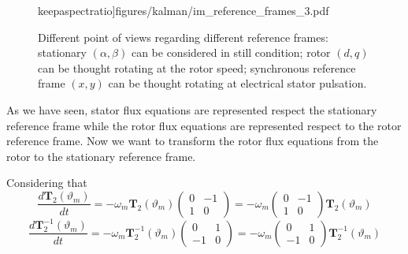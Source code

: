 \documentclass[11pt,a4paper]{scrartcl}
\numberwithin{equation}{section}
\theoremstyle{it}
\theoremstyle{definition}
\begin{document}
\begin{onehalfspace}
\begin{figure}[H]
	keepaspectratio]{figures/kalman/im_reference_frames_3.pdf}
	\captionsetup{width=.5\textwidth}
	\caption{Different point of views regarding different reference frames: 
		stationary $(\alpha,\beta)$ can be considered in still condition; rotor 
		$(d,q)$ can be thought rotating at the rotor speed; synchronous 
		reference 
		frame $(x,y)$ can be thought rotating at electrical stator pulsation.}
	\label{figure_im_ref_frame2} 
\end{figure}

As we have seen, stator flux equations are represented respect the stationary 
reference frame while the rotor flux equations are represented respect to the 
rotor reference frame. Now we want to transform the rotor flux equations from 
the rotor to the stationary reference frame. 

Considering that
\begin{equation}\label{im_eq_15}
	\frac{d\mathbf{T}_2(\vartheta_m)}{dt}= 
	-\omega_m\mathbf{T}_2(\vartheta_m)\begin{pmatrix} 0 & -1\\ 1 & 0 
	\end{pmatrix} = -\omega_m\begin{pmatrix} 0 & -1\\ 1 & 0 \end{pmatrix} 
	\mathbf{T}_2(\vartheta_m)
\end{equation}
\begin{equation}\label{im_eq_16}
	\frac{d\mathbf{T}_2^{-1}(\vartheta_m)}{dt}= 
	-\omega_m\mathbf{T}_2^{-1}(\vartheta_m)\begin{pmatrix} 0 & 1\\ -1 & 0 
	\end{pmatrix} = -\omega_m\begin{pmatrix} 0 & 1\\ -1 & 0 \end{pmatrix} 
	\mathbf{T}_2^{-1}(\vartheta_m)
\end{equation}


\end{onehalfspace}
\end{document}
